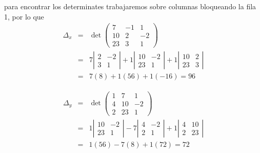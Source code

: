 \documentclass[12pt]{article}
\begin{document}
\begin{multicols}{2}
\begin{enumerate}[A.]
		para encontrar los determinates trabajaremos sobre columnas bloqueando la fila 1, por lo que
		\begin{eqnarray*}
			\Delta_x &=& \det\left(\begin{array}{rrr}
							7 & -1 & 1 \\
							10 & 2 & -2 \\
							23 & 3 & 1
						\end{array}\right) \\
				&=& 7 \left|\begin{array}{rr}
						2 & -2 \\
						3 & 1
					\end{array}\right| 
					+1 \left|\begin{array}{rr}
						10 & -2 \\
						23 & 1
					\end{array}\right| 
					+1 \left|\begin{array}{rr}
						10 & 2 \\
						23 & 3
					\end{array}\right| \\
				&=&  7(8) +1(56) +1(-16) = 96
		\end{eqnarray*}
		
		\begin{eqnarray*}
			\Delta_y &=& \det\left(\begin{array}{rrr}
						1 & 7 & 1 \\
						4 & 10 & -2 \\
						2 & 23 & 1
						\end{array}\right)  \\
				&=& 1 \left|\begin{array}{rr}
						10 & -2 \\
						23 & 1
					\end{array}\right| 
					-7 \left|\begin{array}{rr}
						4 & -2 \\
						2 & 1
					\end{array}\right|
					 +1 \left|\begin{array}{rr}
						4 & 10 \\
						2 & 23
					\end{array}\right| \\
				&=&   1(56) -7(8) +1(72) = 72
		\end{eqnarray*}
		

\end{enumerate}
\end{multicols}
\end{document}
